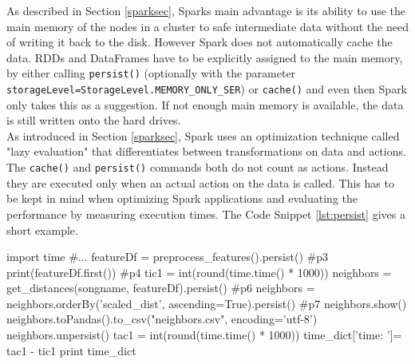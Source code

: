As described in Section \ref{sparksec}, Sparks main advantage is its ability to use the main memory of the nodes in a cluster to safe intermediate data without the need of writing it back to the disk. However Spark does not automatically cache the data. RDDs and DataFrames have to be explicitly assigned to the main memory, by either calling \lstinline{persist()} (optionally with the parameter \lstinline{storageLevel=StorageLevel.MEMORY_ONLY_SER}) or \lstinline{cache()} and even then Spark only takes this as a suggestion. If not enough main memory is available, the data is still written onto the hard drives.\\ As introduced in Section \ref{sparksec}, Spark uses an optimization technique called "lazy evaluation" that differentiates between transformations on data and actions. The \lstinline{cache()} and \lstinline{persist()} commands both do not count as actions. Instead they are executed only when an actual action on the data is called. This has to be kept in mind when optimizing Spark applications and evaluating the performance by measuring execution times. The Code Snippet \ref{lst:persist} gives a short example. 

\begin{pythonCode}[frame=single,label={lst:persist},caption={Spark lazy evaluation},captionpos=b]
import time
#...
featureDf = preprocess_features().persist()	#p3
print(featureDf.first()) #p4
tic1 = int(round(time.time() * 1000))
neighbors = get_distances(songname, featureDf).persist() #p6
neighbors = neighbors.orderBy('scaled_dist', ascending=True).persist() #p7
neighbors.show()
neighbors.toPandas().to_csv("neighbors.csv", encoding='utf-8')
neighbors.unpersist()
tac1 = int(round(time.time() * 1000))
time_dict['time: ']= tac1 - tic1
print time_dict
\end{pythonCode}

